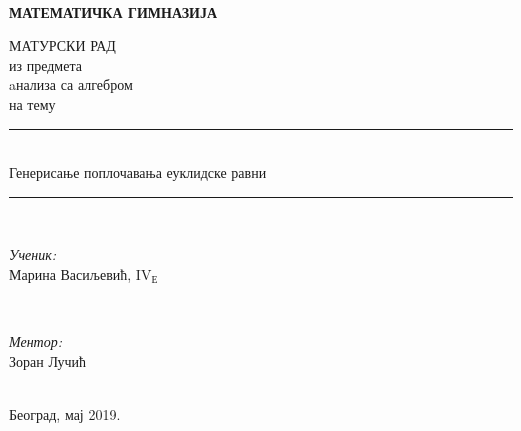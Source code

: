 \documentclass[12pt]{report}
\begin{document}
\newcommand{\HRule}{\rule{\linewidth}{0.5mm}} %

\thispagestyle{empty}
\\
\centerline{\LARGE \textbf{МАТЕМАТИЧКА ГИМНАЗИЈА}}

\vspace*{40mm}
\begin{center}
{\Large МАТУРСКИ РАД}\\
{\Large	из предмета}\\
{\Large	aнализа са алгебром}\\
{\Large	на тему}
\Huge\HRule\\[0.4cm] %
	{Генерисање поплочавања еуклидске равни}\\
	\HRule \\[20pt] %
\begin{minipage}{0.4\textwidth}
\begin{flushleft} \large
\emph{\Large Ученик:}\\
{\Large Марина Васиљевић}, IV$_\text{Е}$\\
\end{flushleft}
\end{minipage}
~
\begin{minipage}{0.4\textwidth}
\begin{flushright} \large
\vspace{0.5cm}
\emph{\Large Ментор:} \\
{\Large Зоран Лучић}\\ 
\end{flushright}
\end{minipage}\\[8cm]
\Large{Београд, мај 2019.}
\end{center}

\tableofcontents

\thispagestyle{empty}

\clearpage
\setcounter{page}{1}
\end{document}
